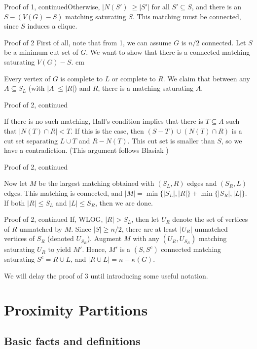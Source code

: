 \documentclass{beamer}
\newcommand{\bframe}[2]{\begin{frame}{#1}#2\end{frame}}
\begin{document}
\bframe{Proof of 1, continued} {Otherwise, $|N(S')| \geq |S'|$ for all $S'\subseteq S$, and there is an $S-(V(G)-S)$ matching saturating $S$. \pause This matching must be connected, since $S$ induces a clique.

}

\bframe{Proof of 2}{
\pause
First of all, note that from 1, we can assume $G$ is $n/2$ connected.  \pause
Let $S$ be a minimum cut set of $G$.  \pause We want to show that there is a connected matching saturating $V(G) - S$.\pause\vskip 0.5 cm 

Every vertex of $G$ is complete to $L$ or complete to $R$.  \pause We claim that between any $A \subseteq S_L$ (with $|A| \leq |R|$) and $R$, there is a matching saturating $A$. \pause 

}

\bframe{Proof of 2, continued}{

If there is no such matching, Hall's condition implies that there is $T \subseteq A$ such that $|N(T) \cap R| < T$.  \pause If this is the case, then $(S-T ) \cup (N(T) \cap R)$ is a cut set separating $L\cup T$ and $R-N(T)$. \pause This cut set is smaller than $S$, so we have a contradiction. \pause (This argument follows Blasiak \cite{blas})

}

\bframe{Proof of 2, continued}{

Now let $M$ be the largest matching obtained with $(S_L,R)$ edges and $(S_R,L)$ edges.  \pause 
This matching is connected, and $|M| = \min\{|S_L|, |R|\} + \min\{|S_R|, |L|\}$. \pause 
If both $|R| \leq S_L$ and $|L| \leq S_R$, then we are done.  
}

\bframe{Proof of 2, continued}{
If, WLOG,  $|R| > S_L$, then let $U_R$ denote the set of vertices of $R$ unmatched by $M$. \pause
 Since $|S|\geq n/2$, there are at least $|U_R|$ unmatched vertices of $S_R$ (denoted $U_{S_R}$).\pause
  Augment $M$ with any $(U_R , U_{S_R})$ matching saturating $U_R$ to yield $M'$. \pause
 Hence, $M'$ is a $(S,S^c)$ connected matching saturating $S^c = R\cup L$, and $|R\cup L| = n-\kappa(G)$. 
}

\bframe{}{
We will delay the proof of 3 until introducing some useful notation.
}

\section{Proximity Partitions}

\subsection{Basic facts and definitions}
\end{document}
